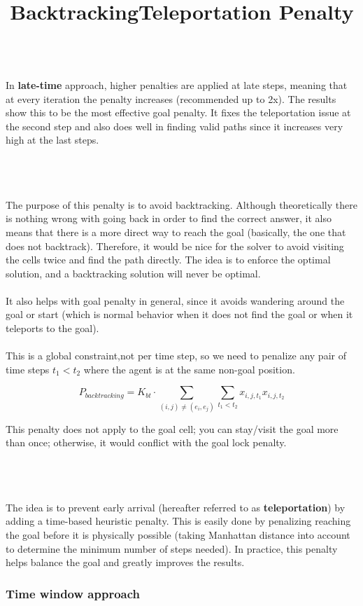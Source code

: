 \documentclass[11pt]{article}
\begin{document}
\\
In \textbf{late-time} approach, higher penalties are applied at late steps, meaning that at every iteration the penalty increases (recommended up to 2x). The results show this to be the most effective goal penalty. It fixes the teleportation issue at the second step and also does well in finding valid paths since it increases very high at the last steps.\\
\\
\title{\textbf{Backtracking}}
\\\\
The purpose of this penalty is to avoid backtracking. Although theoretically there is nothing wrong with going back in order to find the correct answer, it also means that there is a more direct way to reach the goal (basically, the one that does not backtrack). Therefore, it would be nice for the solver to avoid visiting the cells twice and find the path directly. The idea is to enforce the optimal solution, and a backtracking solution will never be optimal. \\
\\
It also helps with goal penalty in general, since it avoids wandering around the goal or start (which is normal behavior when it does not find the goal or when it teleports to the goal).\\
\\
This is a global constraint,not per time step, so we need to penalize any pair of time steps $t_1 < t_2$ where the agent is at the same non-goal position.

\[
P_{backtracking} = K_{bt} \cdot \sum_{(i,j)\ne(e_i,e_j)} \sum_{t_1<t_2} x_{i,j,t_1} x_{i,j,t_2}
\]

This penalty does not apply to the goal cell; you can stay/visit the goal more than once; otherwise, it would conflict with the goal lock penalty.\\
\\
\title{\textbf{Teleportation Penalty}}
\\\\
The idea is to prevent early arrival (hereafter referred to as \textbf{teleportation}) by adding a time-based heuristic penalty. This is easily done by penalizing reaching the goal before it is physically possible (taking Manhattan distance into account to determine the minimum number of steps needed). In practice, this penalty helps balance the goal and greatly improves the results.

\subsubsection{Time window approach}
\end{document}
